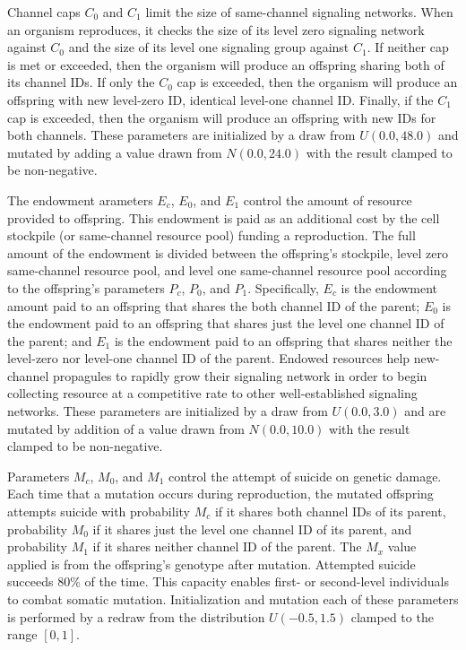 Channel caps $C_0$ and $C_1$ limit the size of same-channel signaling networks.
When an organism reproduces, it checks the size of its level zero signaling network against $C_0$ and the size of its level one signaling group against $C_1$.
If neither cap is met or exceeded, then the organism will produce an offspring sharing both of its channel IDs.
If only the $C_0$ cap is exceeded, then the organism will produce an offspring with new level-zero ID, identical level-one channel ID.
Finally, if the $C_1$ cap is exceeded, then the organism will produce an offspring with new IDs for both channels.
These parameters are initialized by a draw from $U(0.0, 48.0)$ and mutated by adding a value drawn from $N(0.0,24.0)$ with the result clamped to be non-negative.

The endowment arameters $E_{c}$, $E_0$, and $E_1$ control the amount of resource provided to offspring.
This endowment is paid as an additional cost by the cell stockpile (or same-channel resource pool) funding a reproduction.
The full amount of the endowment is divided between the offspring's stockpile, level zero same-channel resource pool, and level one same-channel resource pool according to the offspring's parameters $P_{c}$, $P_0$, and $P_1$.
Specifically, $E_{c}$ is the endowment amount paid to an offspring that shares the both channel ID of the parent;
$E_0$ is the endowment paid to an offspring that shares just the level one channel ID of the parent;
and $E_1$ is the endowment paid to an offspring that shares neither the level-zero nor level-one channel ID of the parent.
Endowed resources help new-channel propagules to rapidly grow their signaling network in order to begin collecting resource at a competitive rate to other well-established signaling networks.
These parameters are initialized by a draw from $U(0.0, 3.0)$ and are mutated by addition of a value drawn from $N(0.0,10.0)$ with the result clamped to be non-negative.

Parameters $M_{c}$, $M_0$, and $M_1$ control the attempt of suicide on genetic damage.
Each time that a mutation occurs during reproduction, the mutated offspring attempts suicide with probability $M_{c}$ if it shares both channel IDs of its parent, probability $M_0$ if it shares just the level one channel ID of its parent, and probability $M_1$ if it shares neither channel ID of the parent.
The $M_x$ value applied is from the offspring's genotype after mutation.
Attempted suicide succeeds %
80\% of the time.
This capacity enables first- or second-level individuals to combat somatic mutation.
Initialization and mutation each of these parameters is performed by a redraw from the distribution $U(-0.5,1.5)$ clamped to the range $[0,1]$.

